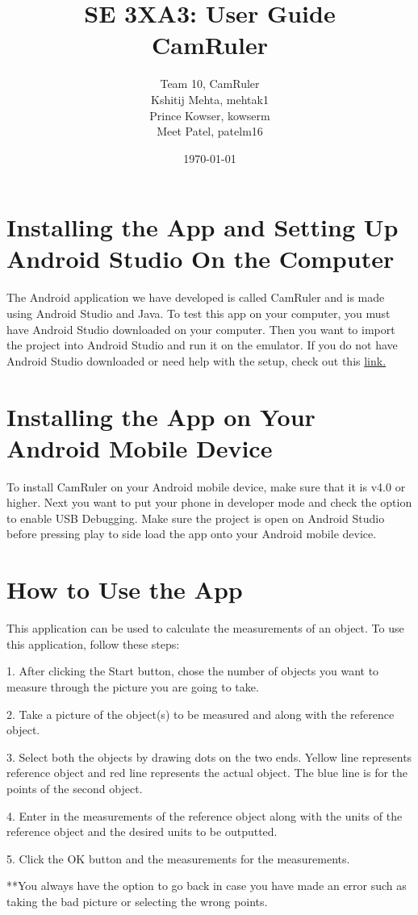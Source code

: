 \documentclass{article}
\begin{document}
\title{SE 3XA3: User Guide\\CamRuler}

\author{Team 10, CamRuler
		\\ Kshitij Mehta, mehtak1
		\\ Prince Kowser, kowserm
		\\ Meet Patel, patelm16
}

\date{\today}

\newpage

\maketitle

\section{Installing the App and Setting Up Android Studio On the Computer}
The Android application we have developed is called CamRuler and is made using Android Studio and Java. To test this app on your computer, you must have Android Studio downloaded on your computer. Then you want to import the project into Android Studio and run it on the emulator. If you do not have Android Studio downloaded or need help with the setup, check out this \href{https://developer.android.com/training/index.html}{link.}

\section{Installing the App on Your Android Mobile Device}
To install CamRuler on your Android mobile device, make sure that it is v4.0 or higher. Next you want to put your phone in developer mode and check the option to enable USB Debugging. Make sure the project is open on Android Studio before pressing play to side load the app onto your Android mobile device. 

\section{How to Use the App}
This application can be used to calculate the measurements of an object. To use this application, follow these steps:

1. After clicking the Start button, chose the number of objects you want to measure through the picture you are going to take.

2. Take a picture of the object(s) to be measured and along with the reference object.

3. Select both the objects by drawing dots on the two ends. Yellow line represents reference object and red line represents the actual object. The blue line is for the points of the second object.

4. Enter in the measurements of the reference object along with the units of the reference object and the desired units to be outputted.

5. Click the OK button and the measurements for the measurements.

**You always have the option to go back in case you have made an error such as taking the bad picture or selecting the wrong points.
\end{document}
